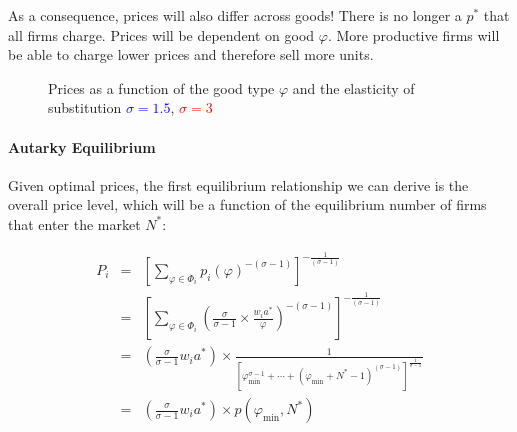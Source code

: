 \documentclass[11pt,letterpaper]{article}
\begin{document}
As a consequence, prices will also differ across goods! There is no longer a $p^*$ that all firms charge. Prices will be dependent on good $\varphi$. More productive firms will be able to charge lower prices \textemdash and therefore sell more units.

    \begin{figure}[htp]
        \centering
            \caption{Prices as a function of the good type $\varphi$ and the elasticity of substitution \textcolor{blue}{$\sigma=1.5$}, \textcolor{red}{$\sigma=3$}}
        \label{fig: ces-markup}
    \end{figure}

\paragraph{Autarky Equilibrium} Given optimal prices, the first equilibrium relationship we can derive is the overall price level, which will be a function of the equilibrium number of firms that enter the market $N^*$:


\begin{eqnarray*}
    P_i &=& \left[ \sum_{\varphi \in \Phi_i } p_i(
\varphi)^{-(\sigma-1)} \right]^{-\tfrac{1}{(\sigma-1)} } \\
&=& \left[ \sum_{\varphi \in \Phi_i } \left( \frac{\sigma}{\sigma-1} \times  \frac{w_i a^*}{\varphi} \right)^{-(\sigma-1)} \right]^{-\tfrac{1}{(\sigma-1)} } \\
&=& \left( \frac{\sigma}{\sigma-1} w_i a^*\right) \times \frac{1}{\left[ \varphi_{\min}^{\sigma-1}+\cdots+(\varphi_{\min}+N^*-1)^{(\sigma-1)} \right]^{\tfrac{1}{\sigma-1} }} \\
&=& \left( \frac{\sigma}{\sigma-1} w_i a^*\right) \times p(\varphi_{\min},N^*)
\end{eqnarray*}
\end{document}
